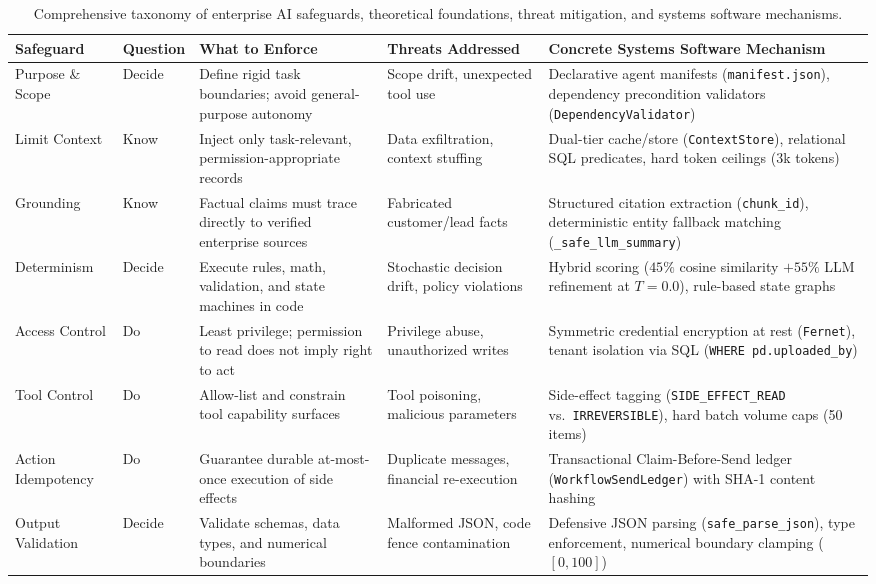 \documentclass[10pt,a4paper,twocolumn]{article}
\begin{document}
\begin{table}[t]
\centering
\caption{Comprehensive taxonomy of enterprise AI safeguards, theoretical foundations, threat mitigation, and systems software mechanisms.}
\label{tab:safeguards}
\footnotesize
\begin{tabularx}{\textwidth}{@{}p{2.6cm} p{1.3cm} Y Y Y@{}}
\toprule
\textbf{Safeguard} & \textbf{Question} & \textbf{What to Enforce} & \textbf{Threats Addressed} & \textbf{Concrete Systems Software Mechanism} \\
\midrule
Purpose \& Scope & Decide & Define rigid task boundaries; avoid general-purpose autonomy & Scope drift, unexpected tool use & Declarative agent manifests (\texttt{manifest.json}), dependency precondition validators (\texttt{DependencyValidator}) \\
Limit Context & Know & Inject only task-relevant, permission-appropriate records & Data exfiltration, context stuffing & Dual-tier cache/store (\texttt{ContextStore}), relational SQL predicates, hard token ceilings (3k tokens) \\
Grounding & Know & Factual claims must trace directly to verified enterprise sources & Fabricated customer/lead facts & Structured citation extraction (\texttt{chunk\_id}), deterministic entity fallback matching (\texttt{\_safe\_llm\_summary}) \\
Determinism & Decide & Execute rules, math, validation, and state machines in code & Stochastic decision drift, policy violations & Hybrid scoring ($45\%$ cosine similarity $+ 55\%$ LLM refinement at $T=0.0$), rule-based state graphs \\
Access Control & Do & Least privilege; permission to read does not imply right to act & Privilege abuse, unauthorized writes & Symmetric credential encryption at rest (\texttt{Fernet}), tenant isolation via SQL (\texttt{WHERE pd.uploaded\_by}) \\
Tool Control & Do & Allow-list and constrain tool capability surfaces & Tool poisoning, malicious parameters & Side-effect tagging (\texttt{SIDE\_EFFECT\_READ} vs.\ \texttt{IRREVERSIBLE}), hard batch volume caps (50 items) \\
Action Idempotency & Do & Guarantee durable at-most-once execution of side effects & Duplicate messages, financial re-execution & Transactional Claim-Before-Send ledger (\texttt{WorkflowSendLedger}) with SHA-1 content hashing \\
Output Validation & Decide & Validate schemas, data types, and numerical boundaries & Malformed JSON, code fence contamination & Defensive JSON parsing (\texttt{safe\_parse\_json}), type enforcement, numerical boundary clamping ($[0,100]$) \\

\end{tabularx}
\end{table}
\end{document}
